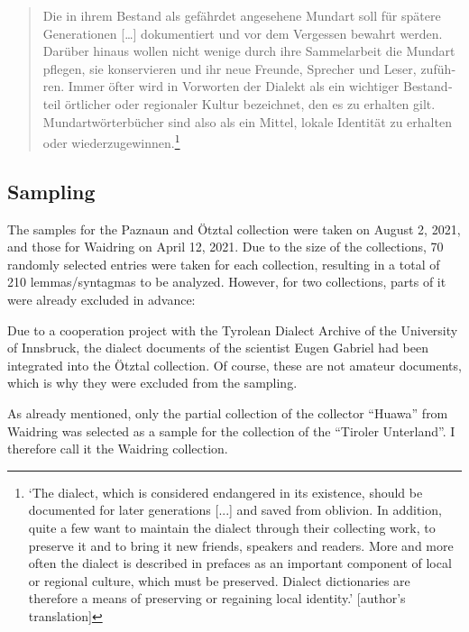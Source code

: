 \documentclass[output=paper]{langscibook}
\begin{document}
\begin{quote}
\foreignlanguage{ngerman}{%
Die in ihrem Bestand als gefährdet angesehene Mundart soll für spätere Generationen […] dokumentiert und vor dem Vergessen bewahrt werden. Darüber hinaus wollen nicht wenige durch ihre Sammelarbeit die Mundart pflegen, sie konservieren und ihr neue Freunde, Sprecher und Leser, zuführen. Immer öfter wird in Vorworten der Dialekt als ein wichtiger Bestandteil örtlicher oder regionaler Kultur bezeichnet, den es zu erhalten gilt. Mundartwörterbücher sind also als ein Mittel, lokale Identität zu erhalten oder wiederzugewinnen.}\footnote{‘The dialect, which is considered endangered in its existence, should be documented for later generations [...] and saved from oblivion. In addition, quite a few want to maintain the dialect through their collecting work, to preserve it and to bring it new friends, speakers and readers. More and more often the dialect is described in prefaces as an important component of local or regional culture, which must be preserved. Dialect dictionaries are therefore a means of preserving or regaining local identity.’ [author’s translation]} \citep[53]{Baur1987}
\end{quote}

\subsection{Sampling}
\label{sec:kathrein:3.2}
The samples for the Paznaun and Ötztal collection were taken on August 2, 2021, and those for Waidring on April 12, 2021. Due to the size of the collections, 70 randomly selected entries were taken for each collection, resulting in a total of 210 lemmas/syntagmas to be analyzed. However, for two collections, parts of it were already excluded in advance:

Due to a cooperation project with the Tyrolean Dialect Archive of the University of Innsbruck, the dialect documents of the scientist Eugen Gabriel had been integrated into the Ötztal collection. Of course, these are not amateur documents, which is why they were excluded from the sampling.

As already mentioned, only the partial collection of the collector “Huawa” from Waidring was selected as a sample for the collection of the “Tiroler Unterland”. I therefore call it the Waidring collection.
\end{document}
